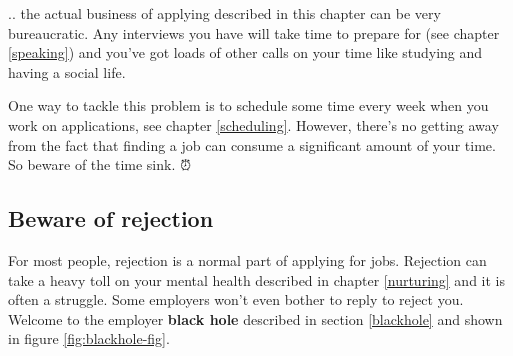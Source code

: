 \documentclass[
]{book}
\begin{document}
.. the actual business of applying described in this chapter can be very bureaucratic. Any interviews you have will take time to prepare for (see chapter \ref{speaking}) and you've got loads of other calls on your time like studying and having a social life.

One way to tackle this problem is to schedule some time every week when you work on applications, see chapter \ref{scheduling}. However, there's no getting away from the fact that finding a job can consume a significant amount of your time. So beware of the time sink. ⏰

\hypertarget{rejection}{%
\subsection{Beware of rejection}\label{rejection}}

For most people, rejection is a normal part of applying for jobs. Rejection can take a heavy toll on your mental health described in chapter \ref{nurturing} and it is often a struggle. Some employers won't even bother to reply to reject you. Welcome to the employer \textbf{black hole} described in section \ref{blackhole} and shown in figure \ref{fig:blackhole-fig}.
\end{document}
